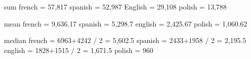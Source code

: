 sum
french = 57,817
spanish = 52,987
English = 29,108
polish = 13,788

mean
french = 9,636.17
spanish = 5,298.7
english = 2,425.67
polish = 1,060.62

median
french = 6963+4242 / 2 = 5,602.5
spanish = 2433+1958 / 2 = 2,195.5
english = 1828+1515 / 2 = 1,671.5
polish = 960
\fi